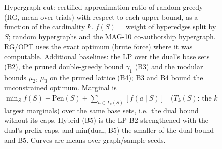 \begin{figure}[t]
\centering
\setlength{\rgplotwidth}{0.49\columnwidth}
\\[1pt]
\hfill
\\

\caption{Hypergraph cut: certified approximation ratio of random greedy (RG, mean over trials) with respect to each upper bound, as a function of the cardinality $k$. $f(S)$ = weight of hyperedges split by $S$; random hypergraphs and the MAG-10 co-authorship hypergraph. RG/OPT uses the exact optimum (brute force) where it was computable. Additional baselines: the LP over the dual's base sets (B2), the pruned double-greedy bound $\gamma_1$ (B3) and the modular bounds $\mu_2$, $\mu_3$ on the pruned lattice (B4); B3 and B4 bound the unconstrained optimum. Marginal is $\min_S f(S)+\mathrm{Pen}(S)+\sum_{a\in T_k(S)}[f(a\mid S)]^+$ ($T_k(S)$: the $k$ largest marginals) over the same base sets, i.e.\ the dual bound without its caps. Hybrid (B5) is the LP B2 strengthened with the dual's prefix caps, and min(dual, B5) the smaller of the dual bound and B5. Curves are means over graph/sample seeds.}
\label{fig:rg-hypergraph_cut-hybrid}
\end{figure}
